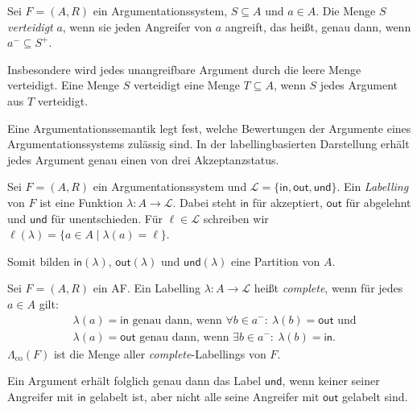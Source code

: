 \begin{Definition}[Verteidigung]
    \label{def:defense}
    Sei \(F=(A,R)\) ein Argumentationssystem, \(S\subseteq A\) und
    \(a\in A\). Die Menge \(S\) \emph{verteidigt} \(a\), wenn sie jeden
    Angreifer von \(a\) angreift, das heißt, genau dann, wenn \(a^-\subseteq S^+\).
\end{Definition}
Insbesondere wird jedes unangreifbare Argument durch die leere Menge
verteidigt. Eine Menge \(S\) verteidigt eine Menge \(T\subseteq A\), wenn
\(S\) jedes Argument aus \(T\) verteidigt.

Eine Argumentationssemantik legt fest, welche Bewertungen der Argumente eines
Argumentationssystems zulässig sind. In der labellingbasierten Darstellung
erhält jedes Argument genau einen von drei Akzeptanzstatus.
\begin{Definition}[Labelling]
    \label{def:labelling}
    Sei \(F=(A,R)\) ein Argumentationssystem und
    \(\mathcal{L}=\{\mathsf{in},\mathsf{out},\mathsf{und}\}\). Ein
    \emph{Labelling} von \(F\) ist eine Funktion
    \(\lambda\colon A\to\mathcal{L}\). Dabei steht \(\mathsf{in}\) für
    akzeptiert, \(\mathsf{out}\) für abgelehnt und \(\mathsf{und}\) für
    unentschieden. Für \(\ell\in\mathcal{L}\) schreiben wir
    \(
        \ell(\lambda)=\{a\in A \mid \lambda(a)=\ell\}.
    \)
\end{Definition}
Somit bilden \(\mathsf{in}(\lambda)\),
\(\mathsf{out}(\lambda)\) und \(\mathsf{und}(\lambda)\) eine Partition
von \(A\).
\begin{Definition}
    \label{def:complete-labelling}
    Sei \(F=(A,R)\) ein AF.
    Ein Labelling \(\lambda\colon A\to\mathcal{L}\) heißt
    \emph{complete}, wenn für jedes \(a\in A\) gilt:
    \begin{align*}
        &\lambda(a)=\mathsf{in}
        \text{ genau dann, wenn }
        \forall b\in a^-:\ \lambda(b)=\mathsf{out} \text{ und}\\
        &\lambda(a)=\mathsf{out}
        \text{ genau dann, wenn }
        \exists b\in a^-:\ \lambda(b)=\mathsf{in}.
    \end{align*}
    \(\Lambda_{\mathrm{co}}(F)\) ist die Menge aller \emph{complete}-Labellings von \(F\).
\end{Definition}
Ein Argument erhält folglich genau dann das Label \(\mathsf{und}\), wenn
keiner seiner Angreifer mit \(\mathsf{in}\) gelabelt ist, aber nicht alle
seine Angreifer mit \(\mathsf{out}\) gelabelt sind.
